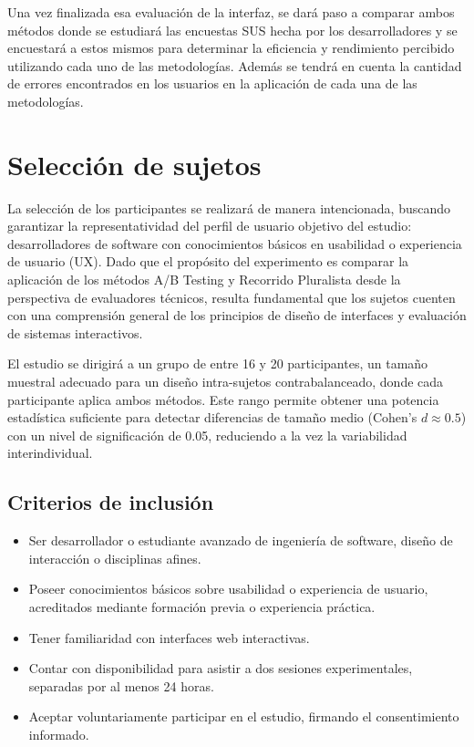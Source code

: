 \documentclass[a4paper,12pt]{report}
\begin{document}
Una vez finalizada esa evaluación de la interfaz, se dará paso a comparar ambos métodos donde se estudiará las encuestas SUS hecha por los desarrolladores y se encuestará a estos mismos para determinar la eficiencia y rendimiento percibido utilizando cada uno de las metodologías. Además se tendrá en cuenta la cantidad de errores encontrados en los usuarios en la aplicación de cada una de las metodologías.

\section{Selección de sujetos}

La selección de los participantes se realizará de manera intencionada, buscando garantizar la representatividad del perfil de usuario objetivo del estudio: desarrolladores de software con conocimientos básicos en usabilidad o experiencia de usuario (UX). Dado que el propósito del experimento es comparar la aplicación de los métodos A/B Testing y Recorrido Pluralista desde la perspectiva de evaluadores técnicos, resulta fundamental que los sujetos cuenten con una comprensión general de los principios de diseño de interfaces y evaluación de sistemas interactivos.

El estudio se dirigirá a un grupo de entre 16 y 20 participantes, un tamaño muestral adecuado para un diseño intra-sujetos contrabalanceado, donde cada participante aplica ambos métodos. Este rango permite obtener una potencia estadística suficiente para detectar diferencias de tamaño medio (Cohen's $d \approx 0.5$) con un nivel de significación de 0.05, reduciendo a la vez la variabilidad interindividual.

\subsection*{Criterios de inclusión}
\begin{itemize}
    \item Ser desarrollador o estudiante avanzado de ingeniería de software, diseño de interacción o disciplinas afines.
    \item Poseer conocimientos básicos sobre usabilidad o experiencia de usuario, acreditados mediante formación previa o experiencia práctica.
    \item Tener familiaridad con interfaces web interactivas.
    \item Contar con disponibilidad para asistir a dos sesiones experimentales, separadas por al menos 24 horas.
    \item Aceptar voluntariamente participar en el estudio, firmando el consentimiento informado.
\end{itemize}
\end{document}
